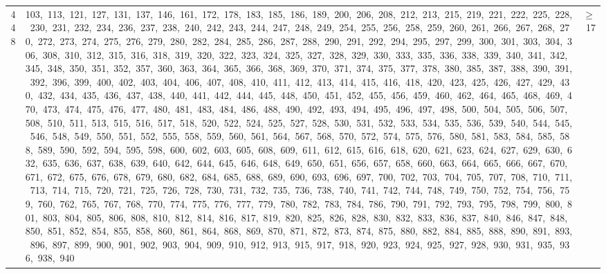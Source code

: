 \begin{longtable}{c|p{}|r}
448 & 103,\ 113,\ 121,\ 127,\ 131,\ 137,\ 146,\ 161,\ 172,\ 178,\ 183,\ 185,\ 186,\ 189,\ 200,\ 206,\ 208,\ 212,\ 213,\ 215,\ 219,\ 221,\ 222,\ 225,\ 228,\ 230,\ 231,\ 232,\ 234,\ 236,\ 237,\ 238,\ 240,\ 242,\ 243,\ 244,\ 247,\ 248,\ 249,\ 254,\ 255,\ 256,\ 258,\ 259,\ 260,\ 261,\ 266,\ 267,\ 268,\ 270,\ 272,\ 273,\ 274,\ 275,\ 276,\ 279,\ 280,\ 282,\ 284,\ 285,\ 286,\ 287,\ 288,\ 290,\ 291,\ 292,\ 294,\ 295,\ 297,\ 299,\ 300,\ 301,\ 303,\ 304,\ 306,\ 308,\ 310,\ 312,\ 315,\ 316,\ 318,\ 319,\ 320,\ 322,\ 323,\ 324,\ 325,\ 327,\ 328,\ 329,\ 330,\ 333,\ 335,\ 336,\ 338,\ 339,\ 340,\ 341,\ 342,\ 345,\ 348,\ 350,\ 351,\ 352,\ 357,\ 360,\ 363,\ 364,\ 365,\ 366,\ 368,\ 369,\ 370,\ 371,\ 374,\ 375,\ 377,\ 378,\ 380,\ 385,\ 387,\ 388,\ 390,\ 391,\ 392,\ 396,\ 399,\ 400,\ 402,\ 403,\ 404,\ 406,\ 407,\ 408,\ 410,\ 411,\ 412,\ 413,\ 414,\ 415,\ 416,\ 418,\ 420,\ 423,\ 425,\ 426,\ 427,\ 429,\ 430,\ 432,\ 434,\ 435,\ 436,\ 437,\ 438,\ 440,\ 441,\ 442,\ 444,\ 445,\ 448,\ 450,\ 451,\ 452,\ 455,\ 456,\ 459,\ 460,\ 462,\ 464,\ 465,\ 468,\ 469,\ 470,\ 473,\ 474,\ 475,\ 476,\ 477,\ 480,\ 481,\ 483,\ 484,\ 486,\ 488,\ 490,\ 492,\ 493,\ 494,\ 495,\ 496,\ 497,\ 498,\ 500,\ 504,\ 505,\ 506,\ 507,\ 508,\ 510,\ 511,\ 513,\ 515,\ 516,\ 517,\ 518,\ 520,\ 522,\ 524,\ 525,\ 527,\ 528,\ 530,\ 531,\ 532,\ 533,\ 534,\ 535,\ 536,\ 539,\ 540,\ 544,\ 545,\ 546,\ 548,\ 549,\ 550,\ 551,\ 552,\ 555,\ 558,\ 559,\ 560,\ 561,\ 564,\ 567,\ 568,\ 570,\ 572,\ 574,\ 575,\ 576,\ 580,\ 581,\ 583,\ 584,\ 585,\ 588,\ 589,\ 590,\ 592,\ 594,\ 595,\ 598,\ 600,\ 602,\ 603,\ 605,\ 608,\ 609,\ 611,\ 612,\ 615,\ 616,\ 618,\ 620,\ 621,\ 623,\ 624,\ 627,\ 629,\ 630,\ 632,\ 635,\ 636,\ 637,\ 638,\ 639,\ 640,\ 642,\ 644,\ 645,\ 646,\ 648,\ 649,\ 650,\ 651,\ 656,\ 657,\ 658,\ 660,\ 663,\ 664,\ 665,\ 666,\ 667,\ 670,\ 671,\ 672,\ 675,\ 676,\ 678,\ 679,\ 680,\ 682,\ 684,\ 685,\ 688,\ 689,\ 690,\ 693,\ 696,\ 697,\ 700,\ 702,\ 703,\ 704,\ 705,\ 707,\ 708,\ 710,\ 711,\ 713,\ 714,\ 715,\ 720,\ 721,\ 725,\ 726,\ 728,\ 730,\ 731,\ 732,\ 735,\ 736,\ 738,\ 740,\ 741,\ 742,\ 744,\ 748,\ 749,\ 750,\ 752,\ 754,\ 756,\ 759,\ 760,\ 762,\ 765,\ 767,\ 768,\ 770,\ 774,\ 775,\ 776,\ 777,\ 779,\ 780,\ 782,\ 783,\ 784,\ 786,\ 790,\ 791,\ 792,\ 793,\ 795,\ 798,\ 799,\ 800,\ 801,\ 803,\ 804,\ 805,\ 806,\ 808,\ 810,\ 812,\ 814,\ 816,\ 817,\ 819,\ 820,\ 825,\ 826,\ 828,\ 830,\ 832,\ 833,\ 836,\ 837,\ 840,\ 846,\ 847,\ 848,\ 850,\ 851,\ 852,\ 854,\ 855,\ 858,\ 860,\ 861,\ 864,\ 868,\ 869,\ 870,\ 871,\ 872,\ 873,\ 874,\ 875,\ 880,\ 882,\ 884,\ 885,\ 888,\ 890,\ 891,\ 893,\ 896,\ 897,\ 899,\ 900,\ 901,\ 902,\ 903,\ 904,\ 909,\ 910,\ 912,\ 913,\ 915,\ 917,\ 918,\ 920,\ 923,\ 924,\ 925,\ 927,\ 928,\ 930,\ 931,\ 935,\ 936,\ 938,\ 940 & $\ge$ 17 \\

\end{longtable}
